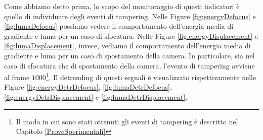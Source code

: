 Come abbiamo detto prima, lo scopo del monitoraggio di questi indicatori \`e quello di individuare degli eventi di tampering.
Nelle Figure \ref{fig:energyDefocus} e \ref{fig:lumaDefocus} possiamo vedere il comportamento dell'energia media di gradiente e luma per un caso di sfocatura.  
Nelle Figure \ref{fig:energyDisplacement} e \ref{fig:lumaDisplacement}, invece, vediamo il comportamento dell'energia media di gradiente e luma per un caso di spostamento della camera.
In particolare, sia nel caso di sfocatura che di spostamento della camera, l'evento di tampering avviene al frame $1000$\footnote{Il modo in cui sono stati ottenuti gli eventi di tampering \`e descritto nel Capitolo \ref{ProveSperimentali}}.
Il detrending di questi segnali \`e visualizzato rispettivamente nelle Figure \ref{fig:energyDetrDefocus}, \ref{fig:lumaDetrDefocus}, \ref{fig:energyDetrDisplacement} e \ref{fig:lumaDetrDisplacement}.\\
